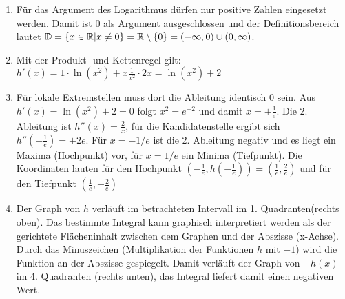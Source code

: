 \item
\begin{enumerate}

\item Für das Argument des Logarithmus dürfen nur positive Zahlen eingesetzt werden. Damit ist $0$ als Argument ausgeschlossen und der Definitionsbereich lautet $\mathbb{D} = \left\lbrace x \in \mathbb{R} | x \ne 0 \right\rbrace = \mathbb{R} \setminus \lbrace 0 \rbrace = (-\infty,0) \cup (0, \infty)$.
\item Mit der Produkt- und Kettenregel gilt: $h'(x) = 1\cdot\ln(x^2) + x \frac{1}{x^2}\cdot 2x = \ln(x^2)+2$
\item Für lokale Extremstellen muss dort die Ableitung identisch $0$ sein. Aus $h'(x) = \ln(x^2)+2 = 0$ folgt $x^2=e^{-2}$ und damit $x = \pm \frac{1}{e}$. Die 2. Ableitung ist $h''(x) = \frac{2}{x}$, für die Kandidatenstelle ergibt sich $h''(\pm \frac{1}{e}) = \pm 2e$. Für $x=-1/e$ ist die 2. Ableitung negativ und es liegt ein Maxima (Hochpunkt) vor, für $x = 1/e$ ein Minima (Tiefpunkt). Die Koordinaten lauten für den Hochpunkt $(-\frac{1}{e}, h(-\frac{1}{e})) =(\frac{1}{e}, \frac{2}{e})$ und für den Tiefpunkt $(\frac{1}{e}, -\frac{2}{e})$
\item Der Graph von $h$ verläuft im betrachteten Intervall im 1. Quadranten(rechts oben). Das bestimmte Integral kann graphisch interpretiert werden als der gerichtete Flächeninhalt zwischen dem Graphen und der Abszisse (x-Achse). Durch das Minuszeichen (Multiplikation der Funktionen $h$ mit $-1$) wird die Funktion an der Abszisse gespiegelt. Damit verläuft der Graph von $-h(x)$ im 4. Quadranten (rechts unten), das Integral liefert damit einen negativen Wert.
\end{enumerate}

